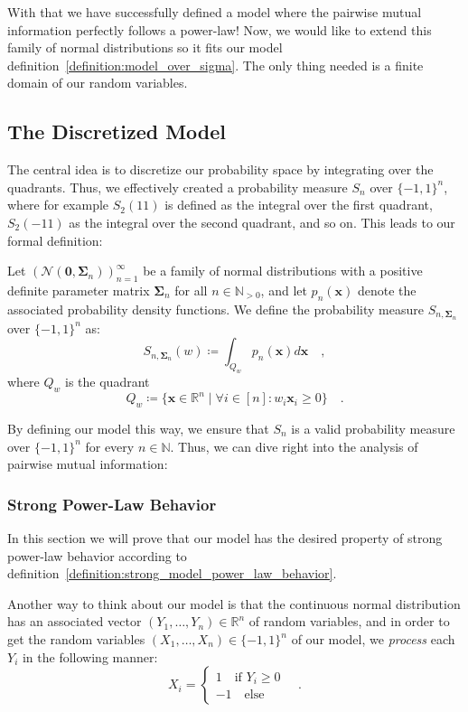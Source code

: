 \documentclass[../../main.tex]{subfiles}
\begin{document}
\bigskip
With that we have successfully defined a model where the pairwise mutual information perfectly follows a power-law! Now, we would like to extend this family of normal distributions so it fits our model definition~\ref{definition:model_over_sigma}. The only thing needed is a finite domain of our random variables.

\subsection{The Discretized Model}
The central idea is to discretize our probability space by integrating over the quadrants. Thus, we effectively created a probability measure $S_n$ over $\{-1, 1\}^n$, where for example $S_2(11)$ is defined as the integral over the first quadrant, $S_2(-11)$ as the integral over the second quadrant, and so on. This leads to our formal definition:

\begin{definition}
    \label{definition:the_model}
    Let $\left(\mathcal{N}(\bm{0}, \bm{\Sigma}_n)\right)_{n=1}^\infty$ be a family of normal distributions with a positive definite parameter matrix $\bm{\Sigma}_n$ for all $n \in \mathbb{N}_{>0}$, and let $p_n(\bm{x})$ denote the associated probability density functions. We define the probability measure $S_{n, \bm{\Sigma}_n}$ over $\{-1, 1\}^n$ as:
    \[
        S_{n, \bm{\Sigma}_n}(w) \coloneqq \int_{Q_w} p_n(\bm{x}) d\bm{x} \quad ,
    \]
    where $Q_w$ is the quadrant
    \[
        Q_w \coloneqq \{ \bm{x} \in \mathbb{R}^n \mid \forall i \in [n] : w_i \bm{x}_i \geq 0 \} \quad .
    \]
\end{definition}

By defining our model this way, we ensure that $S_n$ is a valid probability measure over $\{-1, 1\}^n$ for every $n \in \mathbb{N}$. Thus, we can dive right into the analysis of pairwise mutual information:

\subsubsection{Strong Power-Law Behavior}
In this section we will prove that our model has the desired property of strong power-law behavior according to definition~\ref{definition:strong_model_power_law_behavior}.

Another way to think about our model is that the continuous normal distribution has an associated vector $(Y_1, \dots, Y_n) \in \mathbb{R}^n$ of random variables, and in order to get the random variables $(X_1, \dots, X_n) \in \{-1, 1\}^n$ of our model, we \emph{process} each $Y_i$ in the following manner:
\[
    X_i = \begin{cases}
        1 \quad \text{if } Y_i \geq 0 \\
        -1 \quad \text{else}
    \end{cases}
    \quad .
\]
\end{document}
